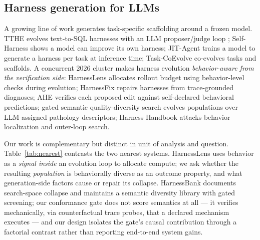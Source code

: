 \subsection{Harness generation for LLMs}\label{related:generation}
A growing line of work generates task-specific scaffolding around a frozen
model. TTHE evolves text-to-SQL harnesses with an LLM proposer/judge loop
\citep{tthe2026}; Self-Harness \citep{selfharness2026} shows a model can
improve its own harness; JIT-Agent \citep{jitagent2026} trains a model to
generate a harness per task at inference time; Task-CoEvolve
\citep{coevolve2026} co-evolves tasks and scaffolds. A concurrent 2026
cluster makes harness evolution \emph{behavior-aware from the verification
side}: HarnessLens \citep{harnesslens2026} allocates rollout budget using
behavior-level checks during evolution; HarnessFix \citep{harnessfix2026}
repairs harnesses from trace-grounded diagnoses; AHE \citep{ahe2026}
verifies each proposed edit against self-declared behavioral predictions;
gated semantic quality-diversity search \citep{gatedqd2026} evolves
populations over LLM-assigned pathology descriptors; Harness Handbook
\citep{handbook2026} attacks behavior localization and outer-loop search.

Our work is complementary but distinct in unit of analysis and question.
Table~\ref{tab:nearest} contrasts the two nearest systems. HarnessLens uses
behavior as a \emph{signal inside} an evolution loop to allocate compute;
we ask whether the resulting \emph{population} is behaviorally diverse as an
outcome property, and what generation-side factors cause or repair its
collapse. HarnessBank \citep{gatedqd2026} documents search-space collapse and
maintains a semantic diversity library with gated screening; our conformance
gate does not score semantics at all --- it verifies mechanically, via
counterfactual trace probes, that a declared mechanism executes --- and our
design isolates the gate's causal contribution through a factorial contrast
rather than reporting end-to-end system gains.

